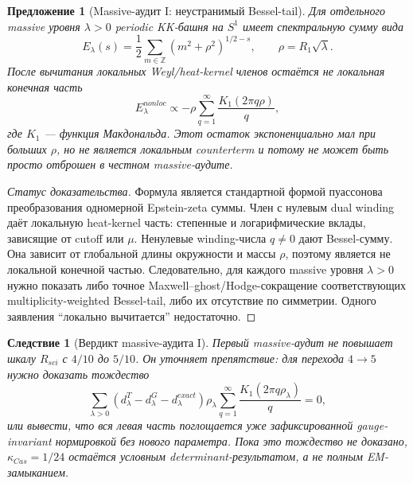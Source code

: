 \documentclass[12pt,a4paper]{report}
\newtheorem{proposition}{Предложение}[chapter]
\newtheorem{corollary}{Следствие}[chapter]
\theoremstyle{remark}
\begin{document}
\begin{proposition}[Massive-аудит I: неустранимый Bessel-tail]
Для отдельного massive уровня \(\lambda>0\) periodic KK-башня на \(S^1\) имеет спектральную сумму вида
\begin{equation}
    E_{\lambda}(s)=\frac12\sum_{m\in\mathbb{Z}}\left(m^2+\rho^2\right)^{1/2-s},
    \qquad
    \rho=R_1\sqrt{\lambda}.
\end{equation}
После вычитания локальных Weyl/heat-kernel членов остаётся не локальная конечная часть
\begin{equation}
    E_{\lambda}^{nonloc}\propto
    -\rho\sum_{q=1}^{\infty}\frac{K_1(2\pi q\rho)}{q},
\end{equation}
где \(K_1\) --- функция Макдональда. Этот остаток экспоненциально мал при больших \(\rho\), но не является локальным counterterm и потому не может быть просто отброшен в честном massive-аудите.
\end{proposition}

\begin{proof}[Статус доказательства]
Формула является стандартной формой пуассонова преобразования одномерной Epstein-zeta суммы. Член с нулевым dual winding даёт локальную heat-kernel часть: степенные и логарифмические вклады, зависящие от cutoff или \(\mu\). Ненулевые winding-числа \(q\neq0\) дают Bessel-сумму. Она зависит от глобальной длины окружности и массы \(\rho\), поэтому является не локальной конечной частью. Следовательно, для каждого massive уровня \(\lambda>0\) нужно показать либо точное Maxwell--ghost/Hodge-сокращение соответствующих multiplicity-weighted Bessel-tail, либо их отсутствие по симметрии. Одного заявления ``локально вычитается'' недостаточно.
\end{proof}

\begin{corollary}[Вердикт massive-аудита I]
Первый massive-аудит не повышает шкалу \(R_{sci}\) с \(4/10\) до \(5/10\). Он уточняет препятствие: для перехода \(4\to5\) нужно доказать тождество
\begin{equation}
    \sum_{\lambda>0}
    \left(d^{T}_{\lambda}-d^{G}_{\lambda}-d^{exact}_{\lambda}\right)
    \rho_{\lambda}
    \sum_{q=1}^{\infty}\frac{K_1(2\pi q\rho_{\lambda})}{q}=0,
\end{equation}
или вывести, что вся левая часть поглощается уже зафиксированной gauge-invariant нормировкой без нового параметра. Пока это тождество не доказано, \(\kappa_{Cas}=1/24\) остаётся условным determinant-результатом, а не полным EM-замыканием.
\end{corollary}
\end{document}
